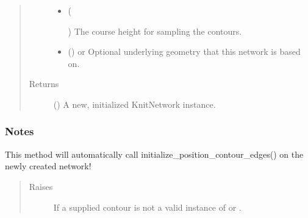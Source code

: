\documentclass[letterpaper,10pt,english]{sphinxmanual}
\begin{document}
\begin{fulllineitems}
\begin{fulllineitems}
\begin{quote}
\begin{description}
\begin{itemize}
\item {} 
 (%
\begin{footnote}[126]\sphinxAtStartFootnote
{}
%
\end{footnote}) \textendash{} The course height for sampling the contours.

\item {} 
 () \textendash{} or 
Optional underlying geometry that this network is based on.

\end{itemize}

\item[{Returns}] \leavevmode
{} () \textendash{} A new, initialized KnitNetwork instance.

\end{description}\end{quote}
\subsubsection*{Notes}

This method will automatically call initialize\_position\_contour\_edges()
on the newly created network!
\begin{quote}\begin{description}
\item[{Raises}] \leavevmode
{\hyperref[\detokenize{cockatoo:cockatoo.exception.KnitNetworkGeometryError}]{}} \textendash{} If a supplied contour is not a valid instance of
     or .

\end{description}\end{quote}

\end{fulllineitems}



\end{fulllineitems}
\end{document}
